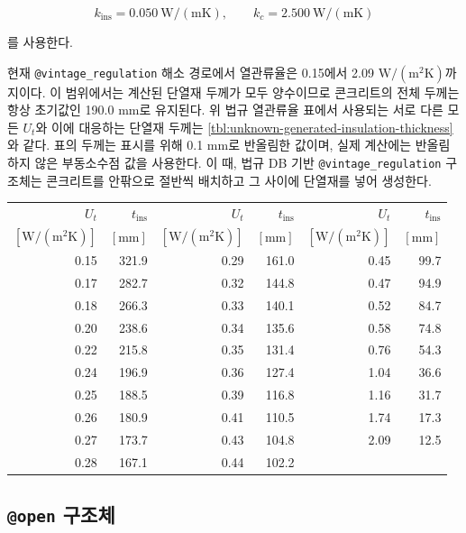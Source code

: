 \[
  k_{\mathrm{ins}}=0.050\ \mathrm{W/(mK)},
  \qquad
  k_c=2.500\ \mathrm{W/(mK)}
\]

를 사용한다.

현재 \texttt{@vintage\_regulation} 해소 경로에서 열관류율은 0.15에서 2.09 $\mathrm{W/(m^2K)}$까지이다. 이 범위에서는 계산된 단열재 두께가 모두 양수이므로 콘크리트의 전체 두께는 항상 초기값인 190.0 mm로 유지된다. 위 법규 열관류율 표에서 사용되는 서로 다른 모든 $U_t$와 이에 대응하는 단열재 두께는 \cref{tbl:unknown-generated-insulation-thickness}와 같다. 표의 두께는 표시를 위해 0.1 mm로 반올림한 값이며, 실제 계산에는 반올림하지 않은 부동소수점 값을 사용한다. 이 때, 법규 DB 기반 \texttt{@vintage\_regulation} 구조체는 콘크리트를 안팎으로 절반씩 배치하고 그 사이에 단열재를 넣어 생성한다. 

\begin{defaulttable}
  \caption{내장 DB의 목표 열관류율별 생성 단열재 두께}
  \label{tbl:unknown-generated-insulation-thickness}
  {\small
  \begin{tabular}{rr@{\qquad}rr@{\qquad}rr}
    \toprule
    $U_t$ & $t_{\mathrm{ins}}$
      & $U_t$ & $t_{\mathrm{ins}}$
      & $U_t$ & $t_{\mathrm{ins}}$ \\
    $[\mathrm{W/(m^2K)}]$ & $[\mathrm{mm}]$
      & $[\mathrm{W/(m^2K)}]$ & $[\mathrm{mm}]$
      & $[\mathrm{W/(m^2K)}]$ & $[\mathrm{mm}]$ \\ \midrule
    0.15 & 321.9 & 0.29 & 161.0 & 0.45 & 99.7 \\
    0.17 & 282.7 & 0.32 & 144.8 & 0.47 & 94.9 \\
    0.18 & 266.3 & 0.33 & 140.1 & 0.52 & 84.7 \\
    0.20 & 238.6 & 0.34 & 135.6 & 0.58 & 74.8 \\
    0.22 & 215.8 & 0.35 & 131.4 & 0.76 & 54.3 \\
    0.24 & 196.9 & 0.36 & 127.4 & 1.04 & 36.6 \\
    0.25 & 188.5 & 0.39 & 116.8 & 1.16 & 31.7 \\
    0.26 & 180.9 & 0.41 & 110.5 & 1.74 & 17.3 \\
    0.27 & 173.7 & 0.43 & 104.8 & 2.09 & 12.5 \\
    0.28 & 167.1 & 0.44 & 102.2 &      &      \\
    \bottomrule
  \end{tabular}
  }
\end{defaulttable}

\subsection{\texttt{@open} 구조체}

